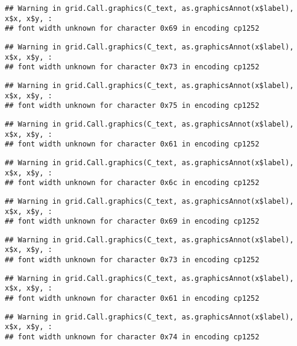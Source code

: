 \documentclass[
]{article}
\begin{document}
\begin{verbatim}
## Warning in grid.Call.graphics(C_text, as.graphicsAnnot(x$label), x$x, x$y, :
## font width unknown for character 0x69 in encoding cp1252
\end{verbatim}

\begin{verbatim}
## Warning in grid.Call.graphics(C_text, as.graphicsAnnot(x$label), x$x, x$y, :
## font width unknown for character 0x73 in encoding cp1252
\end{verbatim}

\begin{verbatim}
## Warning in grid.Call.graphics(C_text, as.graphicsAnnot(x$label), x$x, x$y, :
## font width unknown for character 0x75 in encoding cp1252
\end{verbatim}

\begin{verbatim}
## Warning in grid.Call.graphics(C_text, as.graphicsAnnot(x$label), x$x, x$y, :
## font width unknown for character 0x61 in encoding cp1252
\end{verbatim}

\begin{verbatim}
## Warning in grid.Call.graphics(C_text, as.graphicsAnnot(x$label), x$x, x$y, :
## font width unknown for character 0x6c in encoding cp1252
\end{verbatim}

\begin{verbatim}
## Warning in grid.Call.graphics(C_text, as.graphicsAnnot(x$label), x$x, x$y, :
## font width unknown for character 0x69 in encoding cp1252
\end{verbatim}

\begin{verbatim}
## Warning in grid.Call.graphics(C_text, as.graphicsAnnot(x$label), x$x, x$y, :
## font width unknown for character 0x73 in encoding cp1252
\end{verbatim}

\begin{verbatim}
## Warning in grid.Call.graphics(C_text, as.graphicsAnnot(x$label), x$x, x$y, :
## font width unknown for character 0x61 in encoding cp1252
\end{verbatim}

\begin{verbatim}
## Warning in grid.Call.graphics(C_text, as.graphicsAnnot(x$label), x$x, x$y, :
## font width unknown for character 0x74 in encoding cp1252
\end{verbatim}
\end{document}
